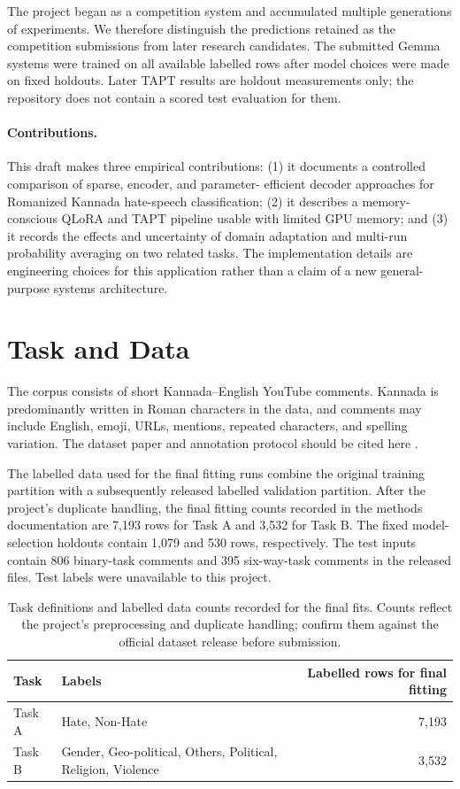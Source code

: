 \documentclass[10pt]{article}
\newcommand{\taska}{Task A}
\newcommand{\taskb}{Task B}
\begin{document}
The project began as a competition system and accumulated multiple generations
of experiments. We therefore distinguish the predictions retained as the
competition submissions from later research candidates. The submitted Gemma
systems were trained on all available labelled rows after model choices were
made on fixed holdouts. Later TAPT results are holdout measurements only; the
repository does not contain a scored test evaluation for them.

\paragraph{Contributions.} This draft makes three empirical contributions:
(1) it documents a controlled comparison of sparse, encoder, and parameter-
efficient decoder approaches for Romanized Kannada hate-speech classification;
(2) it describes a memory-conscious QLoRA and TAPT pipeline usable with limited
GPU memory; and (3) it records the effects and uncertainty of domain adaptation
and multi-run probability averaging on two related tasks. The implementation
details are engineering choices for this application rather than a claim of a
new general-purpose systems architecture.

\section{Task and Data}
The corpus consists of short Kannada--English YouTube comments. Kannada is
predominantly written in Roman characters in the data, and comments may include
English, emoji, URLs, mentions, repeated characters, and spelling variation.
The dataset paper and annotation protocol should be cited here
\cite{hastika_dataset}.

The labelled data used for the final fitting runs combine the original training
partition with a subsequently released labelled validation partition. After
the project's duplicate handling, the final fitting counts recorded in the
methods documentation are 7,193 rows for \taska{} and 3,532 for \taskb{}. The
fixed model-selection holdouts contain 1,079 and 530 rows, respectively. The
test inputs contain 806 binary-task comments and 395 six-way-task comments in
the released files. Test labels were unavailable to this project.

\begin{table}[t]
\centering
\small
\begin{tabularx}{\linewidth}{lXr}
\toprule
Task & Labels & Labelled rows for final fitting \\
\midrule
\taska{} & Hate, Non-Hate & 7,193 \\
\taskb{} & Gender, Geo-political, Others, Political, Religion, Violence & 3,532 \\
\bottomrule
\end{tabularx}
\caption{Task definitions and labelled data counts recorded for the final fits. Counts
reflect the project's preprocessing and duplicate handling; confirm them against the
official dataset release before submission.}
\label{tab:data}
\end{table}
\end{document}
